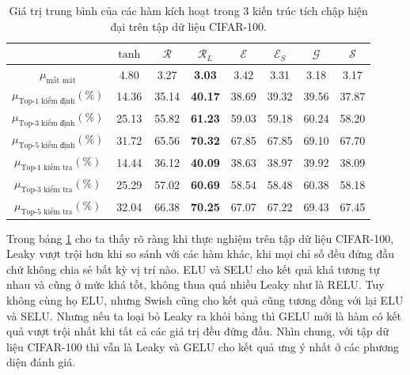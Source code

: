 \begin{table}[ht!]
\centering
\def\arraystretch{1.5}
\begin{tabular}{c|c|c|c|c|c|c|c|}
\cline{2-8}
                        & $\tanh$      & $\mathcal{R}$      & $\mathcal{R}_L$      & $\mathcal{E}$      & $\mathcal{E}_S$      & $\mathcal{G}$      & $\mathcal{S}$      \\ \hline
\multicolumn{1}{|c|}{$\mu_{\text{mất mát}}$} & 4.80  & 3.27  & \textbf{3.03}  & 3.42   & 3.31  & 3.18  & 3.17  \\ \hline
\multicolumn{1}{|c|}{$\mu_{\text{Top-1 kiểm định}} (\%)$} & 14.36 & 35.14 & \textbf{40.17} & 38.69 & 39.32 & 39.56 & 37.87 \\ \hline
\multicolumn{1}{|c|}{$\mu_{\text{Top-3 kiểm định}} (\%)$} & 25.13   & 55.82   & \textbf{61.23}   & 59.03   & 59.18   & 60.24   & 58.20   \\ \hline
\multicolumn{1}{|c|}{$\mu_{\text{Top-5 kiểm định}} (\%)$} & 31.72   & 65.56   & \textbf{70.32}   & 67.85   & 67.85   & 69.10   & 67.70   \\ \hline
\multicolumn{1}{|c|}{$\mu_{\text{Top-1 kiểm tra}} (\%)$} & 14.44 & 36.12 & \textbf{40.09} & 38.63 & 38.97 & 39.92 & 38.09 \\ \hline
\multicolumn{1}{|c|}{$\mu_{\text{Top-3 kiểm tra}} (\%)$} & 25.29   & 57.02   & \textbf{60.69}   & 58.54   & 58.48   & 60.38   & 58.18   \\ \hline
\multicolumn{1}{|c|}{$\mu_{\text{Top-5 kiểm tra}} (\%)$} & 32.04   & 66.38   & \textbf{70.25}   & 67.07   & 67.22   & 69.43   & 67.45   \\ \hline
\end{tabular}
\caption{Giá trị trung bình của các hàm kích hoạt trong 3 kiến trúc tích chập hiện đại trên tập dữ liệu CIFAR-100.}
\label{fig:meancifar100}
\end{table}

Trong bảng \ref{fig:meancifar100} cho ta thấy rõ ràng khi thực nghiệm trên tập dữ liệu CIFAR-100, Leaky vượt trội hơn khi so sánh với các hàm khác, khi mọi chỉ số đều đứng đầu chứ không chia sẻ bất kỳ vị trí nào.
ELU và SELU cho kết quả khá tương tự nhau và cũng ở mức khá tốt, không thua quá nhiều Leaky như là RELU.
Tuy không cùng họ ELU, nhưng Swish cũng cho kết quả cũng tương đồng với lại ELU và SELU.
Nhưng nếu ta loại bỏ Leaky ra khỏi bảng thì GELU mới là hàm có kết quả vượt trội nhất khi tất cả các giá trị đều đứng đầu.
Nhìn chung, với tập dữ liệu CIFAR-100 thì vẫn là Leaky và GELU cho kết quả ưng ý nhất ở các phương diện đánh giá.

